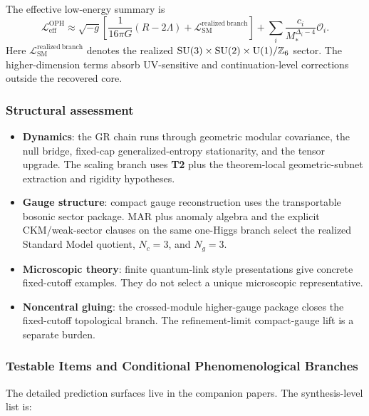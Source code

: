 The effective low-energy summary is
\[
\mathcal L_{\mathrm{eff}}^{\mathrm{OPH}}
\approx
\sqrt{-g}\left[
\frac{1}{16\pi G}(R-2\Lambda)
+
\mathcal L_{\mathrm{SM}}^{\mathrm{realized\ branch}}
\right]
+
\sum_i \frac{c_i}{M_*^{\Delta_i-4}}\mathcal O_i.
\]
Here \(\mathcal L_{\mathrm{SM}}^{\mathrm{realized\ branch}}\) denotes the realized
\(\mathrm{SU}(3)\times\mathrm{SU}(2)\times\mathrm{U}(1)/\mathbb Z_6\) sector. The higher-dimension terms absorb
UV-sensitive and continuation-level corrections outside the recovered core.
\subsubsection{Structural assessment}\label{82-structural-assessment}

\begin{itemize}
\tightlist
\item \textbf{Dynamics}: the GR chain runs through geometric modular covariance, the null bridge,
fixed-cap generalized-entropy stationarity, and the tensor upgrade. The scaling branch uses
\textbf{T2} plus the theorem-local geometric-subnet extraction and rigidity hypotheses.
\item \textbf{Gauge structure}: compact gauge reconstruction uses the transportable bosonic
sector package. MAR plus anomaly algebra and the explicit CKM/weak-sector clauses on the same
one-Higgs branch select the realized Standard Model quotient, \(N_c=3\), and \(N_g=3\).
\item \textbf{Microscopic theory}: finite quantum-link style presentations give concrete
fixed-cutoff examples. They do not select a unique microscopic representative.
\item \textbf{Noncentral gluing}: the crossed-module higher-gauge package closes the fixed-cutoff
topological branch. The refinement-limit compact-gauge lift is a separate burden.
\end{itemize}

\subsubsection{Testable Items and Conditional Phenomenological Branches}\label{83-novel-testable-predictions}

The detailed prediction surfaces live in the companion papers. The synthesis-level list is:

